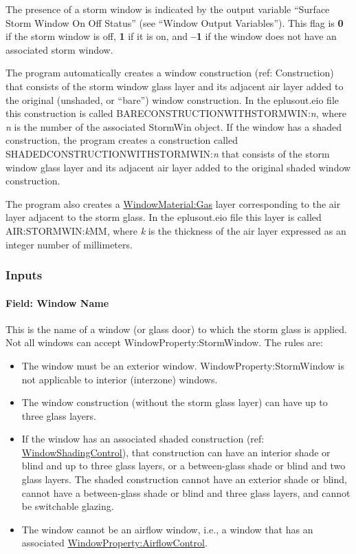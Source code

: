 The presence of a storm window is indicated by the output variable ``Surface Storm Window On Off Status'' (see ``Window Output Variables''). This flag is \textbf{0} if the storm window is off, \textbf{1} if it is on, and \textbf{--1} if the window does not have an associated storm window.

The program automatically creates a window construction (ref: Construction) that consists of the storm window glass layer and its adjacent air layer added to the original (unshaded, or ``bare'') window construction. In the eplusout.eio file this construction is called BARECONSTRUCTIONWITHSTORMWIN:\emph{n}, where \emph{n} is the number of the associated StormWin object. If the window has a shaded construction, the program creates a construction called SHADEDCONSTRUCTIONWITHSTORMWIN:\emph{n} that consists of the storm window glass layer and its adjacent air layer added to the original shaded window construction.

The program also creates a \hyperref[windowmaterialgas]{WindowMaterial:Gas} layer corresponding to the air layer adjacent to the storm glass. In the eplusout.eio file this layer is called AIR:STORMWIN:\emph{k}MM, where \emph{k} is the thickness of the air layer expressed as an integer number of millimeters.

\subsubsection{Inputs}\label{inputs-35-001}

\paragraph{Field: Window Name}\label{field-window-name-000}

This is the name of a window (or glass door) to which the storm glass is applied. Not all windows can accept WindowProperty:StormWindow. The rules are:

\begin{itemize}
\item
  The window must be an exterior window. WindowProperty:StormWindow is not applicable to interior (interzone) windows.
\item
  The window construction (without the storm glass layer) can have up to three glass layers.
\item
  If the window has an associated shaded construction (ref: \hyperref[windowpropertyshadingcontrol]{WindowShadingControl}), that construction can have an interior shade or blind and up to three glass layers, or a between-glass shade or blind and two glass layers. The shaded construction cannot have an exterior shade or blind, cannot have a between-glass shade or blind and three glass layers, and cannot be switchable glazing.
\item
  The window cannot be an airflow window, i.e., a window that has an associated \hyperref[windowpropertyairflowcontrol]{WindowProperty:AirflowControl}.
\end{itemize}

